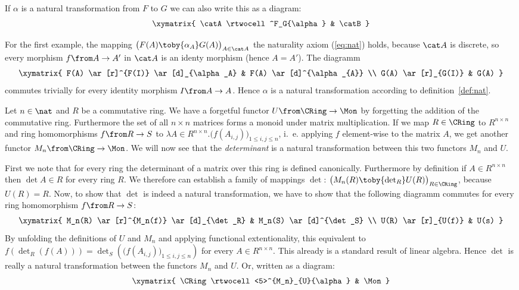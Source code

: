 If $\alpha$ is a natural transformation from $F$ to $G$ we can also write this as a diagram:
\[\xymatrix{
  \catA \rtwocell^F_G{\alpha} & \catB
}\]

\begin{exmp}
  For the first example, the mapping
  $\bigl(F(A)\toby{\alpha_A}G(A)\bigr)_{A\in\catA}$
  the naturality axiom (\ref{eq:nat}) holds, because $\catA$ is discrete, so every morphism $f \from A \to A'$ in $\catA$ is an identy morphism (hence $A=A'$). The diagramm
  \[
    \xymatrix{
      F(A) \ar[r]^{F(I)} \ar[d]_{\alpha_A} & F(A) \ar[d]^{\alpha_{A}} \\
      G(A) \ar[r]_{G(I)} & G(A)
  }\]
  commutes trivially for every identity morphism $I \from A \to A$. Hence $\alpha$ is a natural transformation according to definition~\ref{def:nat}.
\end{exmp}

\begin{exmp}
  Let $n\in\nat$ and $R$ be a commutative ring.
  We have a forgetful functor $U \from \CRing \to \Mon$ by forgetting the addition of the commutative ring.
  Furthermore the set of all $n \times n$ matrices forms a monoid under matrix multiplication.
  If we map $R \in \CRing$ to $R^{n \times n}$ and ring homomorphisms $f \from R \to S$ to
  $\lambda A \in R^{n \times n}. \bigl( f(A_{i,j}) \bigr)_{1 \le i, j \le n}$,
  i.~e. applying $f$ element-wise to the matrix $A$, we get another functor $M_n \from \CRing \to \Mon$.
  We will now see that the \emph{determinant} is a natural transformation between this two functors $M_n$ and $U$.

  First we note that for every ring the determinant of a matrix over this ring is defined canonically.
  Furthermore by definition if $A \in R^{n \times n}$ then $\det A \in R$ for every ring $R$.
  We therefore can establish a family of mappings $\det$:
  $\bigl(M_n(R)\toby{\det_R}U(R)\bigr)_{R\in\CRing}$, because $U(R) = R$.
  Now, to show that $\det$ is indeed a natural transformation, we have to show that the following diagramm commutes for every ring homomorphism $f \from R \to S$:
  \[\xymatrix{
    M_n(R) \ar[r]^{M_n(f)} \ar[d]_{\det_R} & M_n(S) \ar[d]^{\det_S} \\
    U(R) \ar[r]_{U(f)} & U(s)
  }\]
  By unfolding the definitions of $U$ and $M_n$ and applying functional extentionality, this equivalent to
  $f(\det_R(f(A))) = \det_S (\bigl( f(A_{i,j}) \bigr)_{1 \le i, j \le n})$
  for every $A \in R^{n \times n}$.
  This already is a standard result of linear algebra.
  Hence $\det$ is really a natural transformation between the functors $M_n$ and $U$. Or, written as a diagram:
  \[\xymatrix{
    \CRing \rtwocell<5>^{M_n}_{U}{\alpha} & \Mon
  }\]
\end{exmp}


